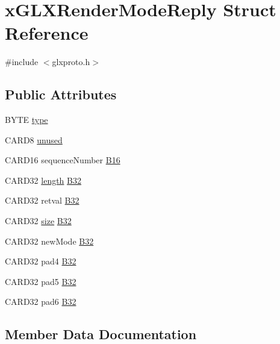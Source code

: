 \hypertarget{structx_g_l_x_render_mode_reply}{}\section{x\+G\+L\+X\+Render\+Mode\+Reply Struct Reference}
\label{structx_g_l_x_render_mode_reply}


{\ttfamily \#include $<$glxproto.\+h$>$}

\subsection*{Public Attributes}
\begin{DoxyCompactItemize}
\item 
B\+Y\+TE \hyperlink{structx_g_l_x_render_mode_reply_a7cca46aefaeddad5216f5517ece8a5dc}{type}
\item 
C\+A\+R\+D8 \hyperlink{structx_g_l_x_render_mode_reply_a8bcfa51e38a17c91fcee84b2623a313c}{unused}
\item 
C\+A\+R\+D16 sequence\+Number \hyperlink{structx_g_l_x_render_mode_reply_aeb1a3010996669693269d681c5f55c09}{B16}
\item 
C\+A\+R\+D32 \hyperlink{glcorearb_8h_ab9c919755bde3b34349e23a32b4e0fa7}{length} \hyperlink{structx_g_l_x_render_mode_reply_a0a8b4632f4257d8fc3058e06e2258d05}{B32}
\item 
C\+A\+R\+D32 retval \hyperlink{structx_g_l_x_render_mode_reply_ac32fbc79ce567ee05f773e2a4076656a}{B32}
\item 
C\+A\+R\+D32 \hyperlink{glcorearb_8h_a3d1e3edfcf61ca2d831883e1afbad89e}{size} \hyperlink{structx_g_l_x_render_mode_reply_aabaaa0d97b50fc8b2851c31b8561e61d}{B32}
\item 
C\+A\+R\+D32 new\+Mode \hyperlink{structx_g_l_x_render_mode_reply_abe3792171662414215b5e78e08396de5}{B32}
\item 
C\+A\+R\+D32 pad4 \hyperlink{structx_g_l_x_render_mode_reply_a37c213c588cdcf2c2efe1cf7f25b73ab}{B32}
\item 
C\+A\+R\+D32 pad5 \hyperlink{structx_g_l_x_render_mode_reply_aa0947abbc10ec6f97e400687f057902d}{B32}
\item 
C\+A\+R\+D32 pad6 \hyperlink{structx_g_l_x_render_mode_reply_a4c1cc549da7c13b0566b0e73fc1f498d}{B32}
\end{DoxyCompactItemize}


\subsection{Member Data Documentation}
\mbox{\label{structx_g_l_x_render_mode_reply_aeb1a3010996669693269d681c5f55c09}} 
